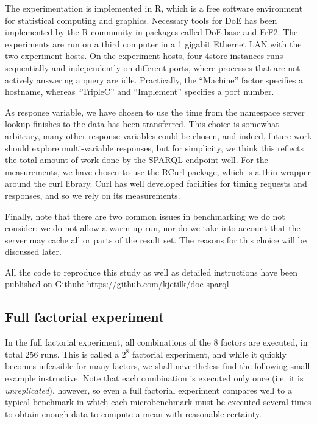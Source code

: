 \documentclass{llncs}
\begin{document}
The experimentation is implemented in R\cite{rmanual}, which is a free
software environment for statistical computing and graphics. Necessary
tools for DoE has been implemented by the R community in packages
called DoE.base\cite{doebase} and FrF2\cite{frf2}. The experiments are
run on a third computer in a 1 gigabit Ethernet LAN with the two
experiment hosts. On the experiment hosts, four 4store instances runs
sequentially and independently on different ports, where processes
that are not actively answering a query are idle. Practically, the
``Machine'' factor specifies a hostname, whereas ``TripleC'' and
``Implement'' specifies a port number.

As response variable, we have chosen to use the time from the
namespace server lookup finishes to the data has been
transferred. This choice is somewhat arbitrary, many other response
variables could be chosen, and indeed, future work should explore
multi-variable responses, but for simplicity, we think this reflects
the total amount of work done by the SPARQL endpoint well. For the
measurements, we have chosen to use the RCurl package\cite{lang2007r},
which is a thin wrapper around the curl library. Curl has well
developed facilities for timing requests and responses, and so we rely
on its measurements.

Finally, note that there are two common issues in benchmarking we do
not consider: we do not allow a warm-up run, nor do we take into
account that the server may cache all or parts of the result set. The
reasons for this choice will be discussed later.

All the code to reproduce this study as well as detailed instructions
have been published on Github: \url{https://github.com/kjetilk/doe-sparql}.

\subsection{Full factorial experiment}\label{sec:full}

In the full factorial experiment, all combinations of the 8 factors
are executed, in total 256 runs. This is called a $2^8$ factorial
experiment, and while it quickly becomes infeasible for many factors,
we shall nevertheless find the following small example
instructive. Note that each combination is executed only once (i.e. it
is \emph{unreplicated}), however, so even a full factorial experiment
compares well to a typical benchmark in which each microbenchmark must
be executed several times to obtain enough data to compute a mean with
reasonable certainty.
\end{document}
